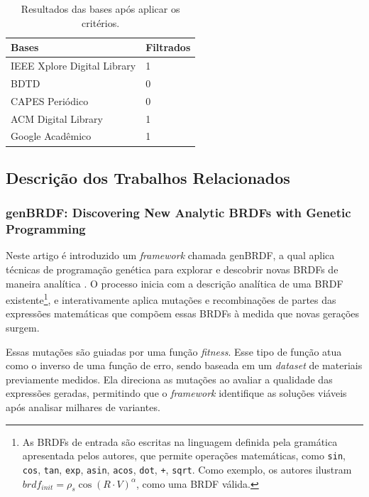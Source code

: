 \begin{table}[H]
\ABNTEXfontereduzida
  \caption{\small Resultados das bases após aplicar os critérios.}
\label{tab-result}
\begin{tabular}{p{6.6cm}|p{6.6cm}}
   \textbf{Bases}  & \textbf{Filtrados}\\
   \hline
    IEEE Xplore Digital Library
   & 1 
    \\ \hline
    BDTD
    & 0
    \\ \hline
    CAPES Periódico
    & 0
    \\ \hline


  ACM Digital Library
  & 1
    \\ \hline
 Google Acadêmico
  & 1
\end{tabular}
\end{table}





\subsection{Descrição dos Trabalhos Relacionados}


\subsubsection{genBRDF: Discovering New Analytic BRDFs with Genetic Programming}


Neste artigo é introduzido um \textit{framework} chamada genBRDF, a qual aplica técnicas de programação genética para explorar e descobrir novas BRDFs de maneira analítica \cite{genbrdf}. O processo inicia com a descrição analítica de uma BRDF existente\footnote{As BRDFs de entrada são escritas na linguagem definida pela gramática apresentada pelos autores, que permite operações matemáticas, como \verb"sin", \verb"cos", \verb"tan", \verb"exp", \verb"asin", \verb"acos", \verb"dot", \verb"+", \verb"sqrt". Como exemplo, os autores ilustram ${brdf}_{init} = \rho_s \cos(R \cdot V)^\alpha$, como uma BRDF válida.}, e interativamente aplica mutações e recombinações de partes das expressões matemáticas que compõem essas BRDFs à medida que novas gerações surgem.

Essas mutações são guiadas por uma função \textit{fitness}.
Esse tipo de função atua como o inverso de uma função de erro, sendo baseada em um \textit{dataset} de materiais previamente medidos. Ela direciona as mutações ao avaliar a qualidade das expressões geradas, permitindo que o \textit{framework} identifique as soluções viáveis após analisar milhares de variantes.

